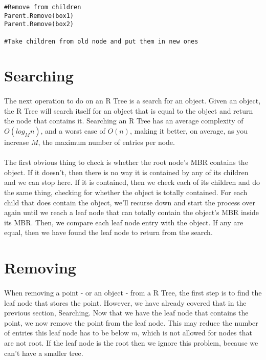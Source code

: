 \documentclass{article}
\begin{document}
\begin{multicols}{2}[]
\begin{lstlisting}
#Remove from children
Parent.Remove(box1)
Parent.Remove(box2)

#Take children from old node and put them in new ones
\end{lstlisting}
\section{Searching}
\paragraph{}
The next operation to do on an R Tree is a search for an object. Given an object, the R Tree will search itself for
an object that is equal to the object and return the node that contains it. Searching an R Tree has an average complexity
of $O(log_Mn)$, and a worst case of $O(n)$, making it better, on average, as you increase $M$, the maximum number of entries
per node.
\paragraph{}
The first obvious thing to check is whether the root
node's MBR contains the object. If it doesn't, then there is no way it is contained by any of its children and we can stop here.
If it is contained, then we check each of its children and do the same thing, checking for whether the object is totally contained.
For each child that does contain the object, we'll recurse down and start the process over again until we reach a leaf node that
can totally contain the object's MBR inside its MBR. Then, we compare each leaf node entry with the object. If any are equal, then
we have found the leaf node to return from the search.

\section{Removing}

\paragraph{}
When removing a point - or an object - from a R Tree, the first step is to find the leaf node that stores the point.
However, we have already covered that in the previous section, Searching. Now that we have the leaf node that contains
the point, we now remove the point from the leaf node. This may reduce the number of entries this leaf node has to be below
$m$, which is not allowed for nodes that are not root. If the leaf node is the root then we ignore this problem, because
we can't have a smaller tree.\\


\end{multicols}
\end{document}
